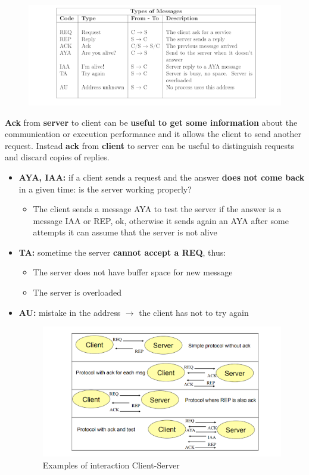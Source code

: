 \begin{figure}[h]
            \centering
            \includegraphics[width=.9\linewidth]{images/clientServerCommunication/addressingTable.png}
    \end{figure}
\textbf{Ack} from \textbf{server} to client can be \textbf{useful to get some information} about the communication or execution performance and it allows the client to send another request. Instead \textbf{ack} from \textbf{client} to server can be useful to distinguish requests and discard copies of replies.
\begin{itemize}
    \item \textbf{AYA, IAA:} if a client sends a request and the answer \textbf{does not come back} in a given time: is the server working properly?
        \begin{itemize}
            \item The client sends a message AYA to test the server if the answer is a message IAA or REP, ok, otherwise it sends again an AYA after some attempts it can assume that the server is not alive
        \end{itemize}
    \item \textbf{TA:} sometime the server \textbf{cannot accept a REQ}, thus:
        \begin{itemize}
            \item The server does not have buffer space for new message
            \item The server is overloaded
        \end{itemize}
    \item \textbf{AU:} mistake in the address \(\rightarrow\) the client has not to try again
    \begin{figure}[!h]
            \centering
            \includegraphics[width=.7\linewidth]{images/clientServerCommunication/exampleInteraction.png}
            \caption{Examples of interaction Client-Server}
    \end{figure}
\end{itemize}

